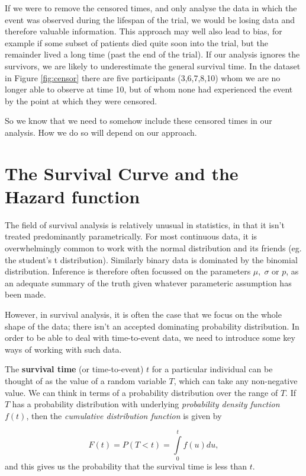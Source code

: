 \documentclass[
  openany]{book}
\theoremstyle{definition}
\theoremstyle{definition}
\theoremstyle{definition}
\theoremstyle{definition}
\theoremstyle{remark}
\begin{document}
If we were to remove the censored times, and only analyse the data in which the event was observed during the lifespan of the trial, we would be losing data and therefore valuable information. This approach may well also lead to bias, for example if some subset of patients died quite soon into the trial, but the remainder lived a long time (past the end of the trial). If our analysis ignores the survivors, we are likely to underestimate the general survival time. In the dataset in Figure \ref{fig:censor} there are five participants (3,6,7,8,10) whom we are no longer able to observe at time 10, but of whom none had experienced the event by the point at which they were censored.

So we know that we need to somehow include these censored times in our analysis. How we do so will depend on our approach.

\section{The Survival Curve and the Hazard function}\label{survhaz}

The field of survival analysis is relatively unusual in statistics, in that it isn't treated predominantly parametrically. For most continuous data, it is overwhelmingly common to work with the normal distribution and its friends (eg. the student's t distribution). Similarly binary data is dominated by the binomial distribution. Inference is therefore often focussed on the parameters \(\mu,\;\sigma\) or \(p\), as an adequate summary of the truth given whatever parameteric assumption has been made.

However, in survival analysis, it is often the case that we focus on the whole shape of the data; there isn't an accepted dominating probability distribution. In order to be able to deal with time-to-event data, we need to introduce some key ways of working with such data.

The \textbf{survival time} (or time-to-event) \(t\) for a particular individual can be thought of as the value of a random variable \(T\), which can take any non-negative value. We can think in terms of a probability distribution over the range of \(T\). If \(T\) has a probability distribution with underlying \emph{probability density function} \(f\left(t\right)\), then the \emph{cumulative distribution function} is given by

\[F\left(t\right) = P\left(T<t\right) = \int\limits_0^t f\left(u\right)du, \]
and this gives us the probability that the survival time is less than \(t\).
\end{document}

